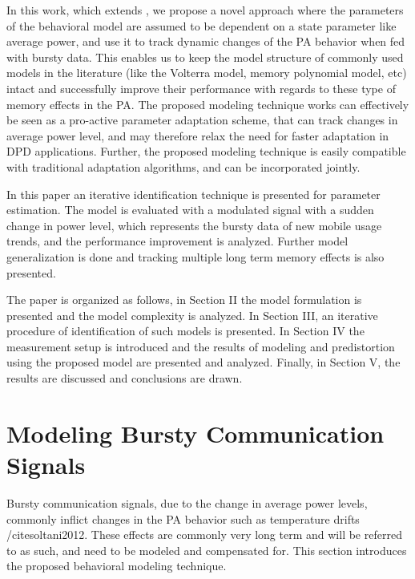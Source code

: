 \documentclass[journal]{IEEEtran}
\begin{document}
In this work, which extends \cite{soltani2012}, we propose a novel approach where the parameters of the behavioral model are assumed to be 
dependent on a state parameter like average power, and use it to track dynamic changes of the PA behavior when fed with bursty data. 
This enables us to keep the model structure of commonly used models in the literature (like the Volterra model, memory polynomial model, etc) intact and successfully improve their performance with regards to these type of memory effects in the PA. The proposed modeling technique works can effectively be seen as a pro-active parameter adaptation scheme, that can track changes in average power level,
and may therefore relax the need for faster adaptation in DPD applications. Further, the proposed modeling technique is easily compatible with traditional adaptation algorithms, and can be incorporated jointly.

In this paper an iterative identification technique is presented for parameter estimation. The model is evaluated with a modulated signal with a sudden change in power level, which represents the bursty data of new mobile usage trends, and the performance improvement is analyzed. Further model generalization is done and tracking multiple long term memory effects is also presented.

The paper is organized as follows, in Section II the model formulation is presented and the model complexity is analyzed. In Section III, an iterative procedure of identification of such models is presented. In Section IV the measurement setup is introduced and the results of modeling and predistortion using the proposed model are presented and analyzed. Finally, in Section V, the results are discussed and conclusions are drawn.

\section{Modeling Bursty Communication Signals}
Bursty communication signals, due to the change in average power levels, commonly inflict changes in the PA behavior such as temperature drifts /cite{soltani2012}.
These effects are commonly very long term and will be referred to as such, and need to be modeled and compensated for. This section introduces the proposed behavioral modeling technique.
\end{document}
